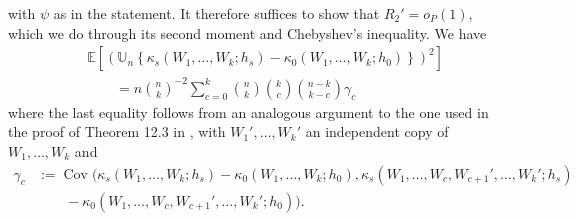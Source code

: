 with $\psi$ as in the statement. It therefore suffices to show that $R_2' = o_P(1)$, which we do through its second moment and Chebyshev's inequality. We have
\begin{align*}
&\mathbb{E}\left[\left(\mathbb{U}_{n}\left\{ \kappa_s(W_1, \dots, W_k; h_s) - \kappa_0(W_{1}, \dots, W_{k}; h_0)\right\}\right)^2\right] \\
&\qquad = n\binom{n}{k}^{-2}\sum_{c = 0}^k\binom{n}{k}\binom{k}{c}\binom{n - k}{k - c}\gamma_c
\end{align*}
where the last equality follows from an analogous argument to the one used in the proof of Theorem 12.3 in \citet{van2000asymptotic}, with $W_1', \dots, W_k'$ an independent copy of $W_1, \dots, W_k$ and
\begin{align*}
\gamma_c &:= \operatorname{Cov}\Big(\kappa_s(W_1, \dots, W_k; h_s) - \kappa_0(W_1, \dots, W_k; h_0), \kappa_s(W_1, \dots, W_c, W_{c + 1}', \dots, W_k'; h_s) \\
&\qquad - \kappa_0(W_1, \dots, W_c, W_{c + 1}', \dots, W_k'; h_0)\Big).
\end{align*}
